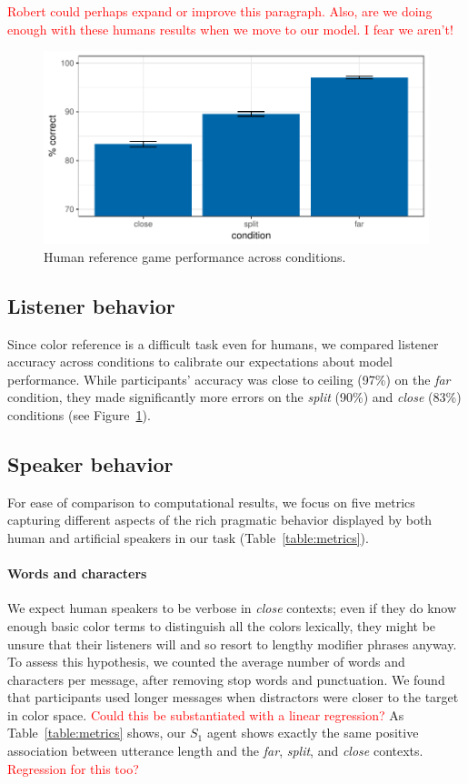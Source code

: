 \documentclass[11pt,letterpaper]{article}
\newcommand{\Speaker}{S}
\renewcommand{\|}{\mid}
\newcommand{\figref}[1]{Figure~\ref{#1}}
\newcommand{\tabref}[1]{Table~\ref{#1}}
\newcommand{\todocheck}[1]{\textcolor{red}{#1}}
\newcommand{\cond}{\emph}
\begin{document}
\todocheck{Robert could perhaps expand or improve this paragraph. Also,
are we doing enough with these humans results when we move to our model.
I fear we aren't!}

\begin{figure}
\includegraphics[scale = .5]{figures/listenerAccuracy}
\caption{Human reference game performance across conditions.}
\label{fig:listenerAccuracy}
\end{figure}

\subsection{Listener behavior}

Since color reference is a difficult task even for humans, we compared listener accuracy across conditions to calibrate our expectations about model performance. While participants' accuracy was close to ceiling (97\%) on the \cond{far} condition, they made significantly more errors on the \cond{split} (90\%) and \cond{close} (83\%) conditions (see \figref{fig:listenerAccuracy}).

\subsection{Speaker behavior}

For ease of comparison to computational results, we focus on five
metrics capturing different aspects of the rich pragmatic behavior
displayed by both human and artificial speakers in our task
(\tabref{table:metrics}).

\paragraph{Words and characters}
We expect human speakers to be verbose in \cond{close} contexts; even if
they do know enough basic color terms to distinguish all the colors
lexically, they might be unsure that their listeners will and so
resort to lengthy modifier phrases anyway. To assess this hypothesis,
we counted the average number of words and characters per message,
after removing stop words and punctuation. We found that participants
used longer messages when distractors were closer to the target in
color space. \todocheck{Could this be substantiated with a linear
  regression?} As \tabref{table:metrics} shows, our $\Speaker_{1}$ agent
shows exactly the same positive association between utterance length
and the \cond{far}, \cond{split}, and \cond{close} contexts. \todocheck{Regression
  for this too?}
\end{document}
